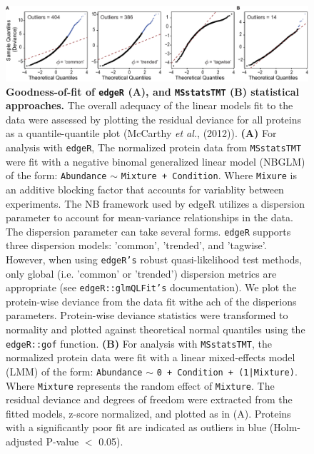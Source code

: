 \documentclass[11pt]{elife}\usepackage[]{graphicx}\usepackage[]{color}
\begin{document}

\begin{figure}[ht]
	\begin{fullwidth}
		\begin{center}
		\includegraphics[width=0.9\paperwidth,keepaspectratio]{gof}
		\caption{\textbf{Goodness-of-fit of \texttt{edgeR} (A), and 
		\texttt{MSstatsTMT} (B) statistical approaches.} The overall
		adequacy of the linear models fit to the data were assessed 
		by plotting the residual deviance for all proteins as a 
		quantile-quantile plot (McCarthy \textit{et al.}, (2012)). 
		\textbf{(A)} For analysis with \texttt{edgeR}, The normalized
		protein data from \texttt{MSstatsTMT} were fit with a negative
		binomal generalized linear model (NBGLM) of the form: 
		\texttt{Abundance} $\sim$ \texttt{Mixture + Condition}.
		Where \texttt{Mixure} is an additive blocking factor that 
		accounts for variablity between experiments. 
		The NB framework used by edgeR utilizes a dispersion parameter 
		to account for mean-variance relationships in the data.
		The dispersion parameter can take several forms. 
                \texttt{edgeR} supports three dispersion models: 'common',
		'trended', and 'tagwise'. However, when using \texttt{edgeR's}
		robust quasi-likelihood test methods, only global (i.e. 'common'
		or 'trended') dispersion metrics are appropriate 
		(see \texttt{edgeR::glmQLFit's} documentation). 
		We plot the protein-wise deviance from the data fit withe ach of
		the disperions parameters. Protein-wise deviance
		statistics were transformed to normality and plotted against
		theoretical normal quantiles using the \texttt{edgeR::gof}
		function. \textbf{(B)} For analysis with \texttt{MSstatsTMT},
		the normalized protein data were fit with a linear mixed-effects 
		model (LMM) of the form: 
		\texttt{Abundance} $\sim$ \texttt{0 + Condition + (1|Mixture)}. 
		Where \texttt{Mixture} represents the random effect
		of \texttt{Mixture}. The residual deviance and degrees of 
		freedom were extracted from the fitted models, z-score
		normalized, and plotted as in (A). Proteins with a significantly 
		poor fit are indicated as outliers in blue 
		(Holm-adjusted P-value $<$ 0.05).}
		\label{fig:gof}
	\end{center}
	\end{fullwidth}
\end{figure}
\end{document}
